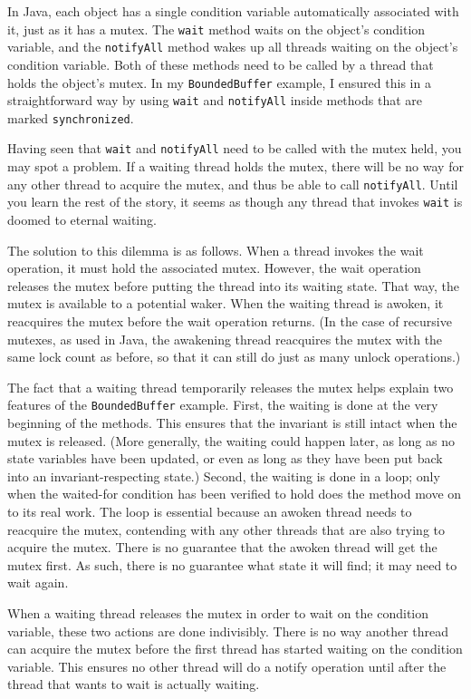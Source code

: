 In Java, each object has a single condition variable automatically
associated with it, just as it has a mutex.  The \verb|wait| method
waits on the object's condition variable, and the \verb|notifyAll|
method wakes up all threads waiting on the object's condition
variable.  Both of these methods need to be called by a thread that
holds the object's mutex.  In my \verb|BoundedBuffer| example, I
ensured this in a straightforward way by using \verb|wait| and
\verb|notifyAll| inside methods that are marked \verb|synchronized|.

Having seen that \verb|wait| and \verb|notifyAll| need to be called
with the mutex held, you may spot a problem.  If a waiting thread
holds the mutex, there will be no way for any other thread to acquire
the mutex, and thus be able to call \verb|notifyAll|.  Until you learn
the rest of the story, it seems as though any thread that invokes
\verb|wait| is doomed to eternal waiting.

The solution to this dilemma is as follows.  When a thread invokes the
wait operation, it must hold the associated mutex.  However, the wait
operation releases the mutex before putting the thread into its
waiting state.  That way, the mutex is available to a potential waker.
When the waiting thread is awoken, it reacquires the mutex before the
wait operation returns.  (In the case of recursive mutexes, as used in
Java, the awakening thread reacquires the mutex with the same lock
count as before, so that it can still do just as many unlock
operations.)

The fact that a waiting thread temporarily releases the mutex helps
explain two features of the \verb|BoundedBuffer| example.  First, the waiting
is done at the very beginning of the methods.  This ensures that the
invariant is still intact when the mutex is released.  (More
generally, the waiting could happen later, as long as no state
variables have been updated, or even as long as they have been put
back into an invariant-respecting state.)  Second, the waiting is done
in a loop; only when the waited-for condition has been verified to
hold does the method move on to its real work.  The loop is essential
because an awoken thread needs to reacquire the mutex, contending with
any other threads that are also trying to acquire the mutex.  There is
no guarantee that the awoken thread will get the mutex first.  As
such, there is no guarantee what state it will find; it may need to
wait again.

When a waiting thread releases the mutex in order to wait on the
condition variable, these two actions are done indivisibly.  There is
no way another thread can acquire the mutex before the first thread
has started waiting on the condition variable.  This ensures no other
thread will do a notify operation until after the thread that wants to
wait is actually waiting.

